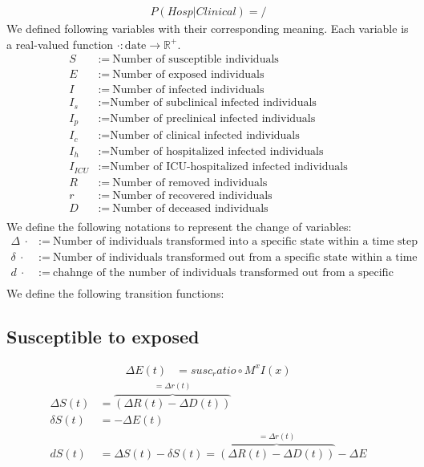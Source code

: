 \documentclass[12pt]{article}
\newcommand{\R}{\mathbb R}
\newcommand{\vect}[1]{\left( #1 \right)}
\begin{document}
\newpage

\begin{align*}
    P(Hosp|Clinical) = /
\end{align*}
We defined following variables with their corresponding meaning. Each variable is a real-valued function $\cdot: \text{date} \to \R^+$.
\begin{align*}
    S & := \ \text{Number of susceptible individuals}\\
    E & := \ \text{Number of exposed individuals}\\
    I & := \ \text{Number of infected individuals}\\
    I_s &:= \text{Number of subclinical infected individuals}\\
    I_p &:= \text{Number of preclinical infected individuals}\\
    I_c &:= \text{Number of clinical infected individuals}\\
    I_h &:= \text{Number of hospitalized infected individuals}\\
    I_{ICU} &:= \text{Number of ICU-hospitalized infected individuals}\\
    R & := \ \text{Number of removed individuals}\\
    r & := \ \text{Number of recovered individuals}\\
    D & := \ \text{Number of deceased individuals}\\ 
\end{align*}
We define the following notations to represent the change of variables:
\begin{align*}
    \Delta \ \cdot &:= \ \text{Number of individuals transformed into a specific state within a time step}\\
    \delta \ \cdot &:= \ \text{Number of individuals transformed out from a specific state within a time step}\\
    d \ \cdot &:= \ \text{chahnge of the number of individuals transformed out from a specific state within a time step}\\
\end{align*}
We define the following transition functions:
\subsection*{Susceptible to exposed}
\begin{align*}
    \Delta E (t) &= susc_ratio \circ M^x I(x)
\end{align*}
\begin{align*}
    \Delta S(t) &= \overbrace{\vect{\Delta R(t) - \Delta D(t)}}^{= \Delta r(t)}\\
    \delta S(t) &= - \Delta E(t)\\
    dS(t) &=  \Delta S(t) - \delta S(t) = \overbrace{\vect{\Delta R(t) - \Delta D(t)}}^{= \Delta r(t)} - \Delta E
\end{align*}
\end{document}

